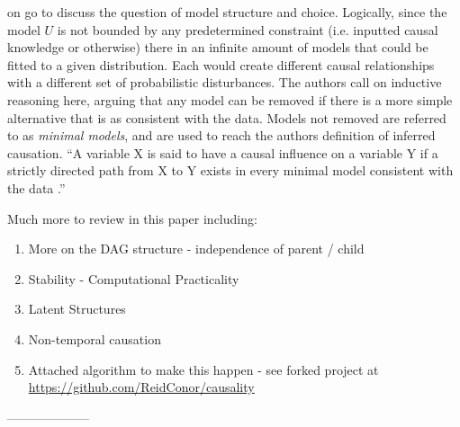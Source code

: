 {\cite {pearl1995theory} on go to discuss the question of model structure and choice. Logically, since the model $U$ is not bounded by any predetermined constraint (i.e. inputted causal knowledge or otherwise) there in an infinite amount of models that could be fitted to a given distribution. Each would create different causal relationships with a different set of probabilistic disturbances. The authors call on inductive reasoning here, arguing that any model can be removed if there is a more simple alternative that is as consistent with the data. Models not removed are referred to as {\it minimal models}, and are used to reach the authors definition of inferred causation. 
``A variable X is said to have a causal influence on a variable Y if a strictly directed path from X to Y exists in every minimal model consistent with the data  \cite {pearl1995theory}.''\\
{\color{red}
Much more to review in this paper including:
\begin{enumerate}
\item{More on the DAG structure - independence of parent / child}
\item{Stability - Computational Practicality}
\item{Latent Structures}
\item{Non-temporal causation}
\item{Attached algorithm to make this happen - see forked project at \url {https://github.com/ReidConor/causality}}
\end{enumerate}}
--------------------
}

